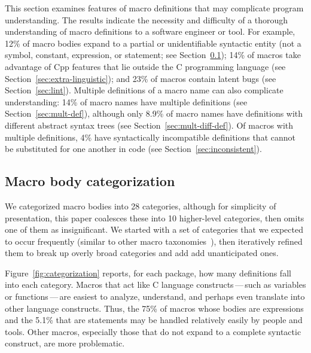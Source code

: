 \documentclass[10pt]{article}
\begin{document}
This section examines features of macro definitions that may complicate
program understanding.  The results indicate the necessity and difficulty
of a thorough understanding of macro definitions to a software engineer or
tool.  For example, 12\% of macro bodies expand to a partial or
unidentifiable syntactic entity (not a symbol, constant, expression, or
statement; see Section~\ref{sec:categorization}); 14\% of macros take
advantage of Cpp features that lie outside the C programming language (see
Section~\ref{sec:extra-linguistic}); and 23\% of macros contain latent bugs
(see Section~\ref{sec:lint}).  Multiple definitions of a macro name can
also complicate understanding:  14\% of macro names have multiple
definitions (see Section~\ref{sec:mult-def}), although only 8.9\% of macro
names have definitions with different abstract syntax trees (see
Section~\ref{sec:mult-diff-def}).  Of macros with multiple definitions, 4\%
have syntactically incompatible definitions that cannot be substituted for
one another in code (see Section~\ref{sec:inconsistent}).


\subsection{Macro body categorization}
\label{sec:categorization}

We categorized macro bodies into 28 categories, although for simplicity of
presentation, this paper coalesces these into 10 higher-level categories,
then omits one of them as insignificant.
We started with a set of categories that we expected to occur frequently
(similar to other macro
taxonomies~\cite{Stroustrup-DesignEvolution,Carroll95}), then iteratively
refined them to break up overly broad categories and add add unanticipated ones.


Figure~\ref{fig:categorization} reports, for each package, how many
definitions fall into each category.  Macros that
act like C language constructs\,---\,such as variables or
functions\,---\,are easiest to analyze, understand, and perhaps even
translate into other language constructs.  Thus, 
the 75\% of macros whose bodies are expressions and the 5.1\% that are
statements may be handled relatively easily by people and tools.  Other
macros, especially those that do not expand to a complete syntactic
construct, are more problematic.
\end{document}
